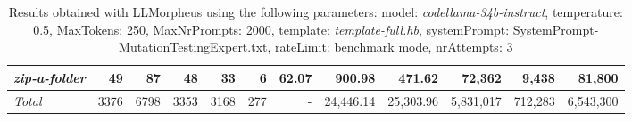\begin{table*}
{\begin{tabular}{l||r|r|r|r|r|r||r|r||r|r|r}
   \hline
   \textit{zip-a-folder} & 49 & 87 & 48 & 33 & 6 & 62.07 & 900.98 & 471.62 & 72,362 & 9,438 & 81,800 \\ 
   \hline
   \textit{Total} & 3376 & 6798 & 3353 & 3168 & 277 & - & 24,446.14  & 25,303.96 & 5,831,017 & 712,283 & 6,543,300 \\ 
 \end{tabular}
 }
 \caption{Results obtained with LLMorpheus using the following parameters: 
   model: \textit{codellama-34b-instruct}, 
   temperature: 0.5, 
   MaxTokens: 250, 
   MaxNrPrompts: 2000, 
   template: \textit{template-full.hb}, 
   systemPrompt: SystemPrompt-MutationTestingExpert.txt, 
   rateLimit: benchmark mode, 
   nrAttempts: 3  
 }
\end{table*}

